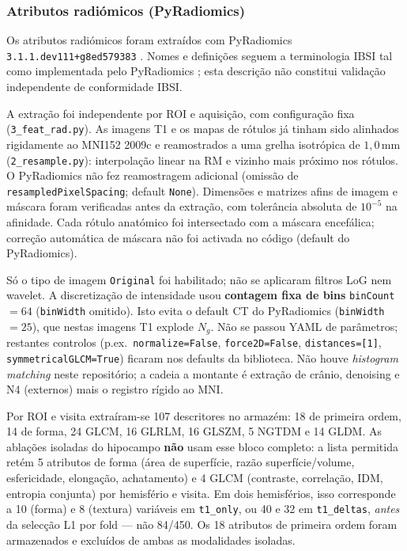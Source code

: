 \documentclass[review]{elsarticle}
\newcommand{\code}[1]{\texttt{#1}}
\begin{document}
	\subsubsection{Atributos radiómicos (PyRadiomics)}\label{sec:radiomics}
	
	Os atributos radiómicos foram extraídos com PyRadiomics
	\code{3.1.1.dev111+g8ed579383} \cite{griethuysen-2017}. Nomes e definições seguem a terminologia IBSI tal como implementada pelo PyRadiomics \cite{zwanenburg-2020}; esta descrição não constitui validação independente de conformidade IBSI.
	
	A extração foi independente por ROI e aquisição, com configuração fixa (\code{3\_feat\_rad.py}). As imagens T1 e os mapas de rótulos já tinham sido alinhados rigidamente ao MNI152 2009c e reamostrados a uma grelha isotrópica de $1{,}0$\,mm (\code{2\_resample.py}): interpolação linear na RM e vizinho mais próximo nos rótulos.
	O PyRadiomics não fez reamostragem adicional (omissão de \code{resampledPixelSpacing}; default \code{None}). Dimensões e matrizes afins de imagem e máscara foram verificadas antes da extração, com tolerância absoluta de \(10^{-5}\) na afinidade.
	Cada rótulo anatómico foi intersectado com a máscara encefálica; correção automática de máscara não foi activada no código (default do PyRadiomics).
	
	Só o tipo de imagem \code{Original} foi habilitado; não se aplicaram filtros LoG nem wavelet.
	A discretização de intensidade usou \textbf{contagem fixa de bins} \code{binCount}$=64$ (\code{binWidth} omitido). Isto evita o default CT do PyRadiomics (\code{binWidth}$=25$), que nestas imagens T1 explode $N_g$.
	Não se passou YAML de parâmetros; restantes controlos (p.ex.\ \code{normalize=False}, \code{force2D=False}, \code{distances=[1]}, \code{symmetricalGLCM=True}) ficaram nos defaults da biblioteca.
	Não houve \emph{histogram matching} neste repositório; a cadeia a montante é extração de crânio, denoising e N4 (externos) mais o registro rígido ao MNI.
	
	Por ROI e visita extraíram-se 107 descritores no armazém: 18 de primeira ordem, 14 de forma, 24 GLCM, 16 GLRLM, 16 GLSZM, 5 NGTDM e 14 GLDM.
	As ablações isoladas do hipocampo \textbf{não} usam esse bloco completo: a lista permitida retém 5 atributos de forma (área de superfície, razão superfície/volume, esfericidade, elongação, achatamento) e 4 GLCM (contraste, correlação, IDM, entropia conjunta) por hemisfério e visita.
	Em dois hemisférios, isso corresponde a 10 (forma) e 8 (textura) variáveis em \code{t1\_only}, ou 40 e 32 em \code{t1\_deltas}, \emph{antes} da selecção L1 por fold --- não 84/450.
	Os 18 atributos de primeira ordem foram armazenados e excluídos de ambas as modalidades isoladas.
	
\end{document}
